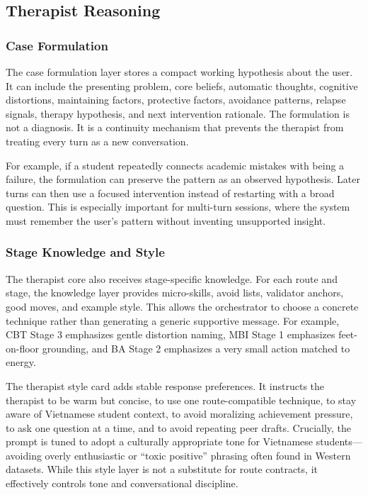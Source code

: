 \subsection{Therapist Reasoning}

\subsubsection{Case Formulation}

The case formulation layer stores a compact working hypothesis about the user. It can include the presenting problem, core beliefs, automatic thoughts, cognitive distortions, maintaining factors, protective factors, avoidance patterns, relapse signals, therapy hypothesis, and next intervention rationale. The formulation is not a diagnosis. It is a continuity mechanism that prevents the therapist from treating every turn as a new conversation.

For example, if a student repeatedly connects academic mistakes with being a failure, the formulation can preserve the pattern as an observed hypothesis. Later turns can then use a focused intervention instead of restarting with a broad question. This is especially important for multi-turn sessions, where the system must remember the user's pattern without inventing unsupported insight.

\subsubsection{Stage Knowledge and Style}

The therapist core also receives stage-specific knowledge. For each route and stage, the knowledge layer provides micro-skills, avoid lists, validator anchors, good moves, and example style. This allows the orchestrator to choose a concrete technique rather than generating a generic supportive message. For example, CBT Stage 3 emphasizes gentle distortion naming, MBI Stage 1 emphasizes feet-on-floor grounding, and BA Stage 2 emphasizes a very small action matched to energy.

The therapist style card adds stable response preferences. It instructs the therapist to be warm but concise, to use one route-compatible technique, to stay aware of Vietnamese student context, to avoid moralizing achievement pressure, to ask one question at a time, and to avoid repeating peer drafts. Crucially, the prompt is tuned to adopt a culturally appropriate tone for Vietnamese students—avoiding overly enthusiastic or ``toxic positive'' phrasing often found in Western datasets. While this style layer is not a substitute for route contracts, it effectively controls tone and conversational discipline.

